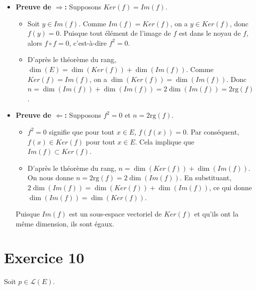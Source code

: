 \documentclass[french]{yLectureNote}
\begin{document}
\begin{itemize}
    \item \textbf{Preuve de $\Rightarrow$:} Supposons $Ker(f)=Im(f)$.
    \begin{itemize}
        \item Soit $y \in Im(f)$. Comme $Im(f)=Ker(f)$, on a $y \in Ker(f)$, donc $f(y)=0$. Puisque tout élément de l'image de $f$ est dans le noyau de $f$, alors $f \circ f = 0$, c'est-à-dire $f^2=0$.
        \item D'après le théorème du rang, $\dim(E)=\dim(Ker(f))+\dim(Im(f))$. Comme $Ker(f)=Im(f)$, on a $\dim(Ker(f))=\dim(Im(f))$. Donc $n = \dim(Im(f))+\dim(Im(f)) = 2\dim(Im(f)) = 2\text{rg}(f)$.
    \end{itemize}

    \item \textbf{Preuve de $\Leftarrow$:} Supposons $f^2=0$ et $n=2\text{rg}(f)$.
    \begin{itemize}
        \item $f^2=0$ signifie que pour tout $x \in E$, $f(f(x))=0$. Par conséquent, $f(x) \in Ker(f)$ pour tout $x \in E$. Cela implique que $Im(f) \subset Ker(f)$.
        \item D'après le théorème du rang, $n=\dim(Ker(f))+\dim(Im(f))$.
        On nous donne $n=2\text{rg}(f)=2\dim(Im(f))$.
        En substituant, $2\dim(Im(f)) = \dim(Ker(f))+\dim(Im(f))$, ce qui donne $\dim(Im(f))=\dim(Ker(f))$.
    \end{itemize}
    Puisque $Im(f)$ est un sous-espace vectoriel de $Ker(f)$ et qu'ils ont la même dimension, ils sont égaux.

\end{itemize}

\section*{Exercice 10}

Soit $p\in\mathcal{L}(E)$.
\end{document}
